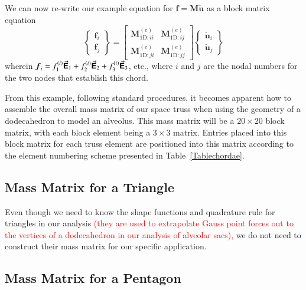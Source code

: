 We can now re-write our example equation for $\boldsymbol{f} = \mathbf{M} \ddot{\boldsymbol{u}}$ as a block matrix equation
\begin{displaymath}
\left\{ \begin{matrix} 
\boldsymbol{f}_i \\ \boldsymbol{f}_j
\end{matrix} \right\} = 
\begin{bmatrix}
\mathbf{M}^{(e)}_{\mathrm{1D}:ii} & \mathbf{M}^{(e)}_{\mathrm{1D}:ij} \\
\mathbf{M}^{(e)}_{\mathrm{1D}:ji} & \mathbf{M}^{(e)}_{\mathrm{1D}:jj}
\end{bmatrix} \left\{ \begin{matrix} 
\ddot{\boldsymbol{u}}_i \\ \ddot{\boldsymbol{u}}_j
\end{matrix} \right\}
\end{displaymath} 
wherein $\boldsymbol{f}_i = f^{(i)}_1 \vec{\boldsymbol{\mathsf{E}}}_1 + f^{(i)}_2 \vec{\boldsymbol{\mathsf{E}}}_2 + f^{(i)}_3 \vec{\boldsymbol{\mathsf{E}}}_3$, etc., where $i$ and $j$ are the nodal numbers for the two nodes that establish this chord.

From this example, following standard procedures, \cite{ClaytonChung18} it becomes apparent how to assemble the overall mass matrix of our space truss when using the geometry of a dodecahedron to model an alveolus.  This mass matrix will be a $20 \! \times \! 20$ block matrix, with each block element being a $3 \! \times \! 3$ matrix.  Entries placed into this block matrix for each truss element are positioned into this matrix according to the element numbering scheme presented in Table~\ref{Tablechordae}.

\subsection{Mass Matrix for a Triangle}

Even though we need to know the shape functions and quadrature rule for triangles in our analysis \textcolor{red}{(they are used to extrapolate Gauss point forces out to the vertices of a dodecahedron in our analysis of alveolar sacs),} we do not need to construct their mass matrix for our specific application.

\subsection{Mass Matrix for a Pentagon}

